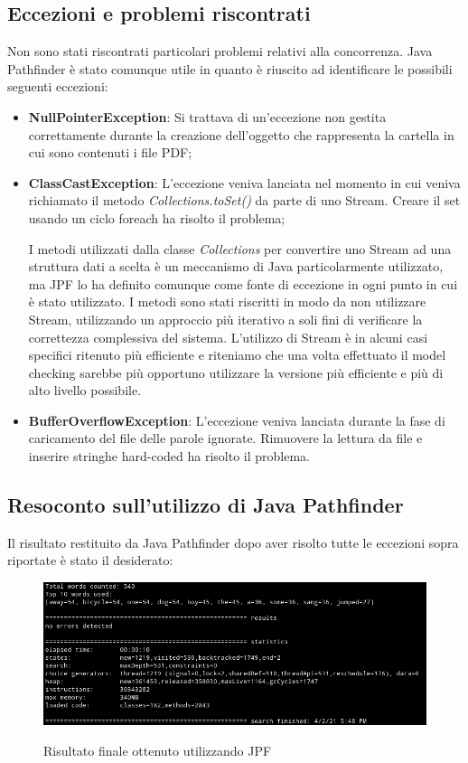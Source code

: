 \subsection{Eccezioni e problemi riscontrati}
Non sono stati riscontrati particolari problemi relativi alla concorrenza.\newline
Java Pathfinder è stato comunque utile in quanto è riuscito ad identificare le possibili seguenti eccezioni:
\begin{itemize}
\item \textbf{NullPointerException}: Si trattava di un'eccezione non gestita correttamente durante la creazione dell'oggetto che rappresenta la cartella in cui sono contenuti i file PDF;
\item \textbf{ClassCastException}: L'eccezione veniva lanciata nel momento in cui veniva richiamato il metodo \textit{Collections.toSet()} da parte di uno Stream. Creare il set usando un ciclo foreach ha risolto il problema;
\begin{info}
I metodi utilizzati dalla classe \textit{Collections} per convertire uno Stream ad una struttura dati a scelta è un meccanismo di Java particolarmente utilizzato, ma JPF lo ha definito comunque come fonte di eccezione in ogni punto in cui è stato utilizzato.
I metodi sono stati riscritti in modo da non utilizzare Stream, utilizzando un approccio più iterativo a soli fini di verificare la correttezza complessiva del sistema.
L'utilizzo di Stream è in alcuni casi specifici ritenuto più efficiente e riteniamo che una volta effettuato il model checking sarebbe più opportuno utilizzare la versione più efficiente e più di alto livello possibile.
\end{info}
\item \textbf{BufferOverflowException}: L'eccezione veniva lanciata durante la fase di caricamento del file delle parole ignorate. Rimuovere la lettura da file e inserire stringhe hard-coded ha risolto il problema.
\end{itemize}
\subsection{Resoconto sull'utilizzo di Java Pathfinder}

Il risultato restituito da Java Pathfinder dopo aver risolto tutte le eccezioni sopra riportate è stato il desiderato:

\begin{figure}[H]
	\begin{center}
		\includegraphics[width=\linewidth]{img/jpf_result.png}
		\label{fig:jpfResult}
		\caption{Risultato finale ottenuto utilizzando JPF}
	\end{center}
\end{figure}

